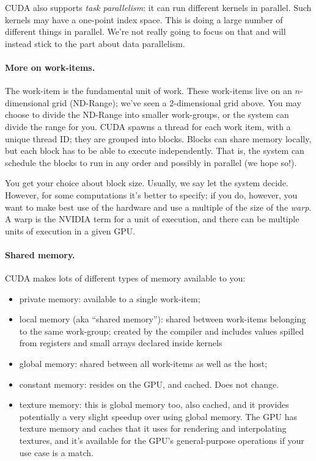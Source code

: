 CUDA also supports \emph{task parallelism}: it can run different
kernels in parallel. Such kernels may have a one-point index space. This is
doing a large number of different things in parallel. We're not really going
to focus on that and will instead stick to the part about data parallelism.

\paragraph{More on work-items.} The work-item is the fundamental
unit of work. These work-items live on an $n$-dimensional
grid (ND-Range); we've seen a 2-dimensional grid above. You may choose
to divide the ND-Range into smaller work-groups, or the system can
divide the range for you. CUDA spawns a thread for each work item,
with a unique thread ID; they are grouped into blocks. Blocks can share 
memory locally, but each block has to be able to execute independently.
That is, the system can schedule the blocks to run in any order and possibly
in parallel (we hope so!). 

You get your choice about block size. Usually, we say let the system decide. However, for some computations it's better to specify; if you do, however, you want to make best use of the hardware and use a multiple of the size of the \textit{warp}. A warp is the NVIDIA term for a unit of execution, and there can be multiple units of execution in a given GPU.

\paragraph{Shared memory.} CUDA makes lots of different types of
memory available to you:

\begin{itemize}
\item private memory: available to a single work-item;
\item local memory (aka ``shared memory''): shared between work-items
  belonging to the same work-group; created by the compiler and includes values spilled from registers and small arrays declared inside kernels~\cite{micikevicius11:_local_memor_regis_spill}
\item global memory: shared between all work-items as well as the host;
\item constant memory: resides on the GPU, and cached. Does not change.
\item texture memory: this is global memory too, also cached, and it provides potentially a very slight speedup over using global memory. The GPU has texture memory and caches that it uses for rendering and interpolating textures, and it's available for the GPU's general-purpose operations if your use case is a match. 
\end{itemize}

